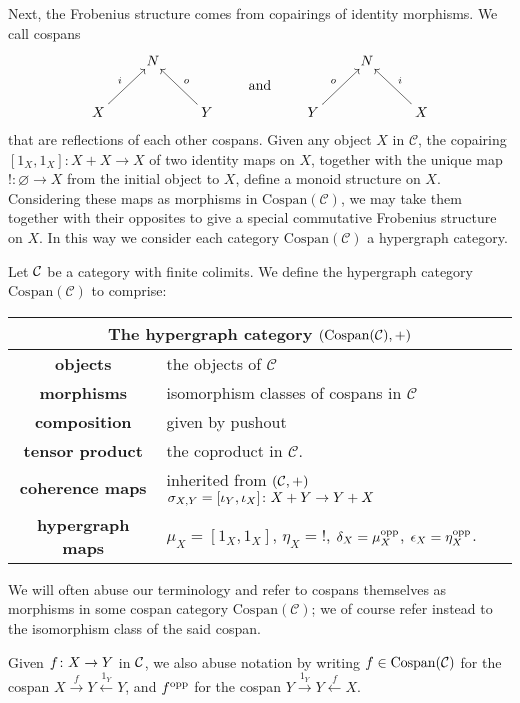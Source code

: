   Next, the Frobenius structure comes from copairings of identity morphisms. We
  call cospans 
  \[
    \xymatrix{
      & N \\
      X \ar[ur]^{i} && Y \ar[ul]_{o}
    }
    \qquad \xymatrix@R=8pt{\\\textrm{and}} \qquad 
    \xymatrix{
      & N \\
      Y \ar[ur]^{o} && X \ar[ul]_{i}
    }
  \]
  that are reflections of each other  cospans. Given any object
  $X$ in $\mathcal C$, the copairing $[1_X,1_X]\colon  X + X \to X$ of two identity
  maps on $X$, together with the unique map $!\colon  \varnothing \to X$ from the
  initial object to $X$, define a monoid structure on $X$. Considering these
  maps as morphisms in $\mathrm{Cospan(\mathcal C)}$, we may take them together
  with their opposites to give a special commutative Frobenius structure on $X$.
  In this way we consider each category $\mathrm{Cospan(\mathcal C)}$ a
  hypergraph category.

\begin{definition} \label{thm.cospanwelldef}
  Let $\mathcal C$ be a category with finite colimits. We define the hypergraph
  category $\mathrm{Cospan}(\mathcal C)$ to comprise:
  
  \begin{center}
  \begin{tabular}{ |c| p{}|}
      \hline
      \multicolumn{2}{|c|}{The hypergraph category $(\mathrm{Cospan(\mathcal C)},+)$} \\
    \hline
    \textbf{objects} & the objects of $\mathcal C$ \\ 
    \textbf{morphisms} & isomorphism classes of cospans in
    $\mathcal C$\\ 
  \textbf{composition} & given by pushout \\
  \textbf{tensor product} & the coproduct in $\mathcal C$. \\
  \textbf{coherence maps} & inherited from $(\mathcal C,+)$ $\sigma_{X,Y} = [\iota_Y,\iota_X] {\colon} X+Y
      \to Y+X$\\
  \textbf{hypergraph maps} & $\mu_X = [1_X,1_X]$, $\eta_X = !$,
      $\delta_X = \mu_X^{\mathrm{opp}}$, $\epsilon_X = \eta_X^{\mathrm{opp}}$. \\
      \hline
  \end{tabular}
\end{center}
\end{definition}
\begin{notation}
  We will often abuse our
terminology and refer to cospans themselves as morphisms in some cospan
category $\mathrm{Cospan}(\mathcal C)$; we of course refer instead to the
isomorphism class of the said cospan.


  Given $f {\colon} X \to Y$ in $\mathcal C$, we also abuse notation by writing $f \in
  \mathrm{Cospan}(\mathcal C)$ for the cospan $X \stackrel{f}\to Y
  \stackrel{1_Y}\leftarrow Y$, and $f^{\mathrm{opp}}$ for the cospan $Y \stackrel{1_Y}\to
  Y \stackrel{f}\leftarrow X$.
\end{notation}

